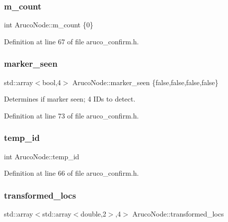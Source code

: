 \subsubsection{\texorpdfstring{m\+\_\+count}{m\_count}}
{\footnotesize\ttfamily int Aruco\+Node\+::m\+\_\+count \{0\}}



Definition at line 67 of file aruco\+\_\+confirm.\+h.

\mbox{\label{class_aruco_node_a2e41167c119527f9fbeb937838fc8909}} 
\subsubsection{\texorpdfstring{marker\+\_\+seen}{marker\_seen}}
{\footnotesize\ttfamily std\+::array$<$bool,4$>$ Aruco\+Node\+::marker\+\_\+seen \{false,false,false,false\}}



Determines if marker seen; 4 I\+Ds to detect. 



Definition at line 73 of file aruco\+\_\+confirm.\+h.

\mbox{\label{class_aruco_node_ac9561321e855855ccc8f643cc139a638}} 
\subsubsection{\texorpdfstring{temp\+\_\+id}{temp\_id}}
{\footnotesize\ttfamily int Aruco\+Node\+::temp\+\_\+id}



Definition at line 66 of file aruco\+\_\+confirm.\+h.

\mbox{\label{class_aruco_node_ab410bc0b655071ee67e7ba63b4edf256}} 
\subsubsection{\texorpdfstring{transformed\+\_\+locs}{transformed\_locs}}
{\footnotesize\ttfamily std\+::array$<$std\+::array$<$double,2$>$,4$>$ Aruco\+Node\+::transformed\+\_\+locs}



